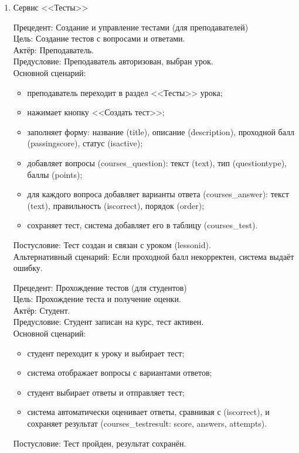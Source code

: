 \begin{enumerate}
	\item {Сервис <<Тесты>>}
	
	{Прецедент: Создание и управление тестами (для преподавателей)} \\
	{Цель}: Создание тестов с вопросами и ответами. \\
	{Актёр}: Преподаватель. \\
	{Предусловие}: Преподаватель авторизован, выбран урок. \\
	{Основной сценарий}:
	\begin{itemize}
		\item преподаватель переходит в раздел <<Тесты>> урока;
		\item нажимает кнопку <<Создать тест>>;
		\item заполняет форму: название (title), описание (description), проходной балл (passingscore), статус (isactive);
		\item добавляет вопросы (courses\_question): текст (text), тип (questiontype), баллы (points);
		\item для каждого вопроса добавляет варианты ответа (courses\_answer): текст (text), правильность (iscorrect), порядок (order);
		\item сохраняет тест, система добавляет его в таблицу (courses\_test).
	\end{itemize}
	{Постусловие}: Тест создан и связан с уроком (lessonid). \\
	{Альтернативный сценарий}: Если проходной балл некорректен, система выдаёт ошибку.
	
	{Прецедент: Прохождение тестов (для студентов)} \\
	{Цель}: Прохождение теста и получение оценки. \\
	{Актёр}: Студент. \\
	{Предусловие}: Студент записан на курс, тест активен. \\
	{Основной сценарий}:
	\begin{itemize}
		\item студент переходит к уроку и выбирает тест;
		\item система отображает вопросы с вариантами ответов;
		\item студент выбирает ответы и отправляет тест;
		\item система автоматически оценивает ответы, сравнивая с (iscorrect), и сохраняет результат (courses\_testresult: score, answers, attempts).
	\end{itemize}
	{Постусловие}: Тест пройден, результат сохранён.
	

\end{enumerate}
